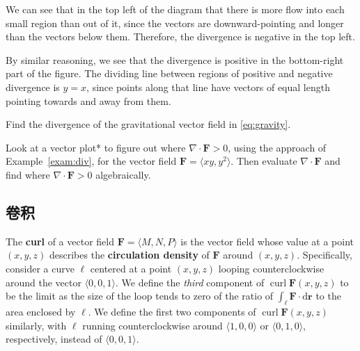 \documentclass[indent]{watsonbook}
\begin{document}
\begin{solution}
  We can see that in the top left of the diagram that there is more
  flow into each small region than out of it, since the vectors are
  downward-pointing and longer than the vectors below them. Therefore,
  the divergence is negative in the top left.

  By similar reasoning, we see that the divergence is positive in the
  bottom-right part of the figure. The dividing line between regions
  of positive and negative divergence is $y = x$, since points along
  that line have vectors of equal length pointing towards and away
  from them.
\end{solution}


\begin{exercise}{}{}
  Find the divergence of the gravitational vector field in
  \eqref{eq:gravity}.
\end{exercise}

\begin{exercise}{}{}
  Look at a vector plot* to figure out where
  $\nabla \cdot \mathbf{F} > 0$, using the approach of
  Example~\ref{exam:div}, for the vector field
  $\mathbf{F} = \langle xy, y^2 \rangle$. Then evaluate
  $\nabla \cdot \mathbf{F}$ and find where
  $\nabla \cdot \mathbf{F} > 0$ algebraically.
\end{exercise}

\subsection{卷积}


The \textbf{curl} of a vector field $\mathbf{F} = \langle M, N, P \rangle$ is the vector field whose value at a point $(x,y,z)$ describes the \textbf{circulation density} of $\mathbf{F}$ around $(x,y,z)$. Specifically, consider a curve $\ell$ centered at a point $(x,y,z)$ looping counterclockwise around the vector $\langle 0, 0, 1 \rangle$. We define the \textit{third} component of $\operatorname{curl} \mathbf{F}(x,y,z)$ to be the limit as the size of the loop tends to zero of the ratio of $\int_\ell \mathbf{F} \cdot \mathrm{d} \mathbf{r}$ to the area enclosed by $\ell$. We define the first two components of $\operatorname{curl} \mathbf{F}(x,y,z)$ similarly, with $\ell$ running counterclockwise around $\langle 1, 0, 0 \rangle$ or $\langle 0, 1, 0 \rangle$, respectively, instead of $\langle 0, 0, 1 \rangle$.
\end{document}
